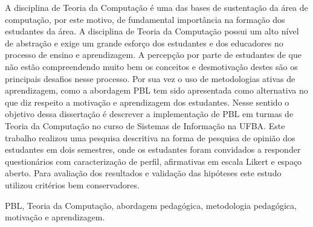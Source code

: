\resumo
A disciplina de Teoria da Computação é uma das bases de
sustentação da área de computação, por este motivo, de
fundamental importância na formação dos estudantes
da área.
A disciplina de Teoria da Computação possui
um alto nível de abstração e exige um grande esforço
dos estudantes e dos educadores no processo de
ensino e aprendizagem.
A percepção por parte de estudantes de
que não estão compreendendo muito bem os conceitos e
desmotivação destes são os principais desafios nesse processo.
Por sua vez o uso de metodologias ativas de aprendizagem, como
a abordagem \ac{PBL} tem sido apresentada
como alternativa no que diz respeito a motivação
e aprendizagem dos estudantes.
Nesse sentido o objetivo dessa dissertação é descrever a implementação
de \ac{PBL} em turmas de Teoria da Computação no curso de Sistemas
de Informação na \ac{UFBA}.
Este trabalho realizou uma pesquisa descritiva na forma
de pesquisa de opinião dos estudantes em dois semestres, onde
os estudantes foram convidados a responder questionários com
caracterização de perfil, afirmativas em escala Likert e
espaço aberto.
Para avaliação dos resultados e validação das hipóteses
este estudo utilizou critérios bem conservadores.
\begin{keywords}
\ac{PBL}, Teoria da Computação, abordagem pedagógica, metodologia pedagógica, motivação e aprendizagem.
\end{keywords}
